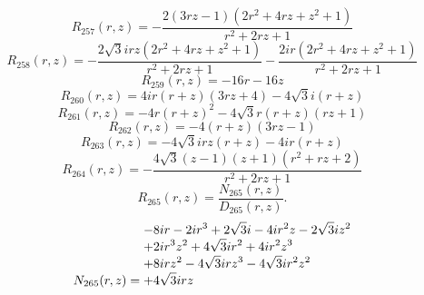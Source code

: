 \documentclass[11pt,a4paper]{article}
\begin{document}
\begin{equation}
R_{257}(r,z)=- \frac{2 \left(3 r z - 1\right) \left(2 r^{2} + 4 r z + z^{2} + 1\right)}{r^{2} + 2 r z + 1}
\label{eq:cat-rational-257}
\end{equation}
\begin{equation}
R_{258}(r,z)=- \frac{2 \sqrt{3} i r z \left(2 r^{2} + 4 r z + z^{2} + 1\right)}{r^{2} + 2 r z + 1} - \frac{2 i r \left(2 r^{2} + 4 r z + z^{2} + 1\right)}{r^{2} + 2 r z + 1}
\label{eq:cat-rational-258}
\end{equation}
\begin{equation}
R_{259}(r,z)=- 16 r - 16 z
\label{eq:cat-rational-259}
\end{equation}
\begin{equation}
R_{260}(r,z)=4 i r \left(r + z\right) \left(3 r z + 4\right) - 4 \sqrt{3} i \left(r + z\right)
\label{eq:cat-rational-260}
\end{equation}
\begin{equation}
R_{261}(r,z)=- 4 r \left(r + z\right)^{2} - 4 \sqrt{3} r \left(r + z\right) \left(r z + 1\right)
\label{eq:cat-rational-261}
\end{equation}
\begin{equation}
R_{262}(r,z)=- 4 \left(r + z\right) \left(3 r z - 1\right)
\label{eq:cat-rational-262}
\end{equation}
\begin{equation}
R_{263}(r,z)=- 4 \sqrt{3} i r z \left(r + z\right) - 4 i r \left(r + z\right)
\label{eq:cat-rational-263}
\end{equation}
\begin{equation}
R_{264}(r,z)=- \frac{4 \sqrt{3} \left(z - 1\right) \left(z + 1\right) \left(r^{2} + r z + 2\right)}{r^{2} + 2 r z + 1}
\label{eq:cat-rational-264}
\end{equation}
\begin{equation}
R_{265}(r,z)=\frac{N_{265}(r,z)}{D_{265}(r,z)}.
\label{eq:cat-rational-265}
\end{equation}
\begin{equation}
N_{265}(r,z)=\shortstack[l]{$\displaystyle  - 8 i r - 2 i r^{3} + 2 \sqrt{3} i - 4 i r^{2} z - 2 \sqrt{3} i z^{2}$\\
$\displaystyle  + 2 i r^{3} z^{2} + 4 \sqrt{3} i r^{2} + 4 i r^{2} z^{3}$\\
$\displaystyle  + 8 i r z^{2} - 4 \sqrt{3} i r z^{3} - 4 \sqrt{3} i r^{2} z^{2}$\\
$\displaystyle  + 4 \sqrt{3} i r z$}
\label{eq:cat-numerator-265}
\end{equation}
\end{document}
